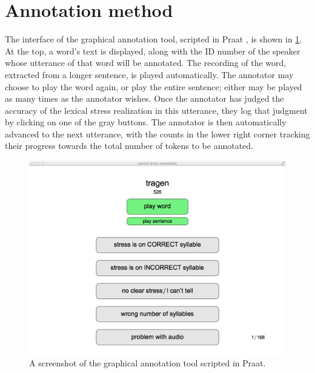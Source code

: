 	\section{Annotation method}
	\label{sec:lexstress:method}


	
	The interface of the graphical annotation tool, scripted in Praat \parencite{Boersma2014}, is shown in \cref{fig:annotationtool}. At the top, a word's text is displayed, along with the ID number of the speaker whose utterance of that word will be annotated. The recording of the word, extracted from a longer sentence, is played automatically. The annotator may choose to play the word again, or play the entire sentence; either may be played as many times as the annotator wishes. Once the annotator has judged the accuracy of the lexical stress realization in this utterance, they log that judgment by clicking on one of the gray buttons. The annotator is then automatically advanced to the next utterance, with the counts in the lower right corner tracking their progress towards the total number of tokens to be annotated. 
	
		\begin{figure}[bht]
			\centering
			\includegraphics[width=\textwidth]{../img/screenshots/AnnotationTool}
			\caption{A screenshot of the graphical annotation tool scripted in Praat.  }
			\label{fig:annotationtool}
		\end{figure}
	

